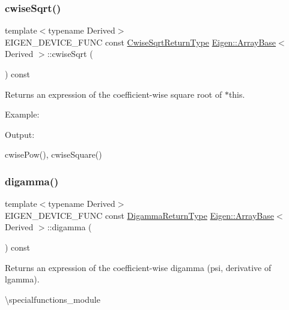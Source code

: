 \subsubsection{\texorpdfstring{cwiseSqrt()}{cwiseSqrt()}}
{\footnotesize\ttfamily template$<$typename Derived$>$ \\
E\+I\+G\+E\+N\+\_\+\+D\+E\+V\+I\+C\+E\+\_\+\+F\+U\+NC const \mbox{\hyperlink{class_eigen_1_1_cwise_unary_op}{Cwise\+Sqrt\+Return\+Type}} \mbox{\hyperlink{class_eigen_1_1_array_base}{Eigen\+::\+Array\+Base}}$<$ Derived $>$\+::cwise\+Sqrt (\begin{DoxyParamCaption}{ }\end{DoxyParamCaption}) const\hspace{0.3cm}{\ttfamily [inline]}}

\begin{DoxyReturn}{Returns}
an expression of the coefficient-\/wise square root of $\ast$this.
\end{DoxyReturn}
Example\+: 
\begin{DoxyCodeInclude}{0}
\end{DoxyCodeInclude}
 Output\+: 
\begin{DoxyVerbInclude}
\end{DoxyVerbInclude}
 cwise\+Pow(), cwise\+Square() \mbox{\label{class_eigen_1_1_array_base_a8fe3f90b672d2c4e80bf1c74b6b088e5}} 
\subsubsection{\texorpdfstring{digamma()}{digamma()}}
{\footnotesize\ttfamily template$<$typename Derived$>$ \\
E\+I\+G\+E\+N\+\_\+\+D\+E\+V\+I\+C\+E\+\_\+\+F\+U\+NC const \mbox{\hyperlink{class_eigen_1_1_cwise_unary_op}{Digamma\+Return\+Type}} \mbox{\hyperlink{class_eigen_1_1_array_base}{Eigen\+::\+Array\+Base}}$<$ Derived $>$\+::digamma (\begin{DoxyParamCaption}{ }\end{DoxyParamCaption}) const\hspace{0.3cm}{\ttfamily [inline]}}

\begin{DoxyReturn}{Returns}
an expression of the coefficient-\/wise digamma (psi, derivative of lgamma).
\end{DoxyReturn}
\textbackslash{}specialfunctions\+\_\+module

